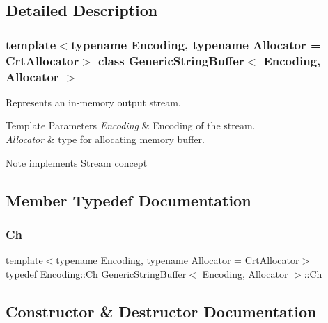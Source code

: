 \subsection{Detailed Description}
\subsubsection*{template$<$typename Encoding, typename Allocator = Crt\+Allocator$>$\newline
class Generic\+String\+Buffer$<$ Encoding, Allocator $>$}

Represents an in-\/memory output stream. 


\begin{DoxyTemplParams}{Template Parameters}
{\em Encoding} & Encoding of the stream. \\
\hline
{\em Allocator} & type for allocating memory buffer. \\
\hline
\end{DoxyTemplParams}
\begin{DoxyNote}{Note}
implements Stream concept 
\end{DoxyNote}


\subsection{Member Typedef Documentation}
\mbox{\label{classGenericStringBuffer_a735b75db076ffe86d0d294be49655d46}} 
\subsubsection{\texorpdfstring{Ch}{Ch}}
{\footnotesize\ttfamily template$<$typename Encoding, typename Allocator = Crt\+Allocator$>$ \\
typedef Encoding\+::\+Ch \hyperlink{classGenericStringBuffer}{Generic\+String\+Buffer}$<$ Encoding, Allocator $>$\+::\hyperlink{classGenericStringBuffer_a735b75db076ffe86d0d294be49655d46}{Ch}}



\subsection{Constructor \& Destructor Documentation}
\mbox{\label{classGenericStringBuffer_a62f5ea1a53a2a3f98088f8c152b6183e}} 
